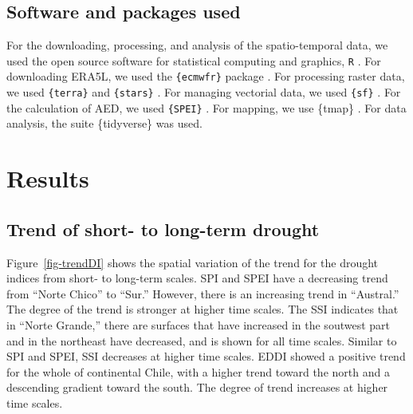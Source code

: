 \documentclass[
  authoryear,
  preprint,
  3p,
  onecolumn]{elsarticle}
\begin{document}
\hypertarget{software-and-packages-used}{%
\subsection{Software and packages
used}\label{software-and-packages-used}}

For the downloading, processing, and analysis of the spatio-temporal
data, we used the open source software for statistical computing and
graphics, \texttt{R} \citep{R2023}. For downloading ERA5L, we used the
\texttt{\{ecmwfr\}} package \citep{Hufkens2019}. For processing raster
data, we used \texttt{\{terra\}} \citep{Hijmans2023} and
\texttt{\{stars\}} \citep{Pebesma2023}. For managing vectorial data, we
used \texttt{\{sf\}} \citep{Pebesma2018}. For the calculation of AED, we
used \texttt{\{SPEI\}} \citep{Bergueria2023}. For mapping, we use
\{tmap\} \citep{Tennekes2018}. For data analysis, the suite
\{tidyverse\} \citep{Wickham2019} was used.

\hypertarget{results}{%
\section{Results}\label{results}}

\hypertarget{trend-of-short--to-long-term-drought-1}{%
\subsection{Trend of short- to long-term
drought}\label{trend-of-short--to-long-term-drought-1}}

Figure~\ref{fig-trendDI} shows the spatial variation of the trend for
the drought indices from short- to long-term scales. SPI and SPEI have a
decreasing trend from ``Norte Chico'' to ``Sur.'' However, there is an
increasing trend in ``Austral.'' The degree of the trend is stronger at
higher time scales. The SSI indicates that in ``Norte Grande,'' there
are surfaces that have increased in the soutwest part and in the
northeast have decreased, and is shown for all time scales. Similar to
SPI and SPEI, SSI decreases at higher time scales. EDDI showed a
positive trend for the whole of continental Chile, with a higher trend
toward the north and a descending gradient toward the south. The degree
of trend increases at higher time scales.

\blandscape
\end{document}
